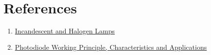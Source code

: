 \section*{References}

\begin{enumerate}

\item \href{https://www.fh-muenster.de/ciw/downloads/personal/juestel/juestel/4-InkohaerenteLichtquellen-Glueh-_und_Halogenlampen_english_-1.pdf}{Incandescent and Halogen Lamps}

\item \href{https://www.elprocus.com/photodiode-working-principle-applications/}{Photodiode Working Principle, Characteristics and Applications}

\end{enumerate}



\newpage